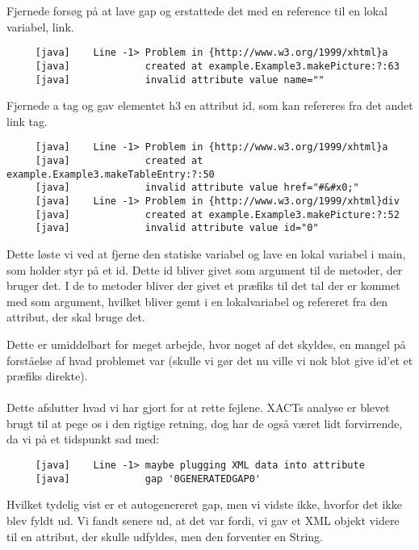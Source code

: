 \documentclass[a4paper,10pt]{article}
\begin{document}
Fjernede forsøg på at lave gap og erstattede det med en reference til en lokal variabel, link.
\begin{lstlisting}
     [java]    Line -1> Problem in {http://www.w3.org/1999/xhtml}a 
     [java]             created at example.Example3.makePicture:?:63
     [java]             invalid attribute value name=""
\end{lstlisting}
Fjernede a tag og gav elementet h3 en attribut id, som kan refereres fra det andet link tag.
\begin{lstlisting}
     [java]    Line -1> Problem in {http://www.w3.org/1999/xhtml}a 
     [java]             created at example.Example3.makeTableEntry:?:50
     [java]             invalid attribute value href="#&#x0;"
     [java]    Line -1> Problem in {http://www.w3.org/1999/xhtml}div 
     [java]             created at example.Example3.makePicture:?:52
     [java]             invalid attribute value id="0"
\end{lstlisting}
Dette løste vi ved at fjerne den statiske variabel og lave en lokal variabel i main, som holder styr på et id. Dette id bliver givet som argument til de metoder, der bruger det. I de to metoder bliver der givet et præfiks til det tal der er kommet med som argument, hvilket bliver gemt i en lokalvariabel og refereret fra den attribut, der skal bruge det.

Dette er umiddelbart for meget arbejde, hvor noget af det skyldes, en mangel på forståelse af hvad problemet var (skulle vi gør det nu ville vi nok blot give id'et et præfiks direkte).\\\\
Dette afslutter hvad vi har gjort for at rette fejlene. XACTs analyse er blevet brugt til at pege os i den rigtige retning, dog har de også været lidt forvirrende, da vi på et tidspunkt sad med:
\begin{lstlisting}
     [java]    Line -1> maybe plugging XML data into attribute
     [java]             gap '0GENERATEDGAP0'
\end{lstlisting} 
Hvilket tydelig vist er et autogenereret gap, men vi vidste ikke, hvorfor det ikke blev fyldt ud. Vi fandt senere ud, at det var fordi, vi gav et XML objekt videre til en attribut, der skulle udfyldes, men den forventer en String.

 
\end{document}
